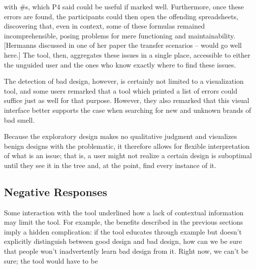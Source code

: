 \documentclass[conference]{IEEEtran}
\begin{document}
	with \#s, which P4 said could be useful if marked well. Furthermore, once these
	errors are found, the participants could then open the offending spreadsheets,
	discovering that, even in context, some of these formulas remained
	incomprehensible, posing problems for mere functioning and maintainability.
	[Hermanns discussed in one of her paper the transfer scenarios -- would go well
	here.] The tool, then, aggregates these issues in a single place, accessible to
	either the unguided user and the ones who know exactly where to find these
	issues. \par The detection of bad design, however, is certainly not limited to
	a visualization tool, and some users remarked that a tool which printed a list
	of errors could suffice just as well for that purpose. However, they also
	remarked that this visual interface better supports the case when searching for
	new and unknown brands of bad smell.
	
	Because the exploratory design makes no qualitative judgment and visualizes
	benign designs with the problematic, it therefore allows for flexible
	interpretation of what is an issue; that is, a user might not realize a certain
	design is suboptimal until they see it in the tree and, at the point, find
	every instance of it.
	
	\subsection{Negative Responses} Some interaction with the tool underlined how a
	lack of contextual information may limit the tool. For example, the benefits
	described in the previous sections imply a hidden complication: if the tool
	educates through example but doesn't explicitly distinguish between good design
	and bad design, how can we be sure that people won't inadvertently learn bad
	design from it. Right now, we can't be sure; the tool would have to be
	
\end{document}
